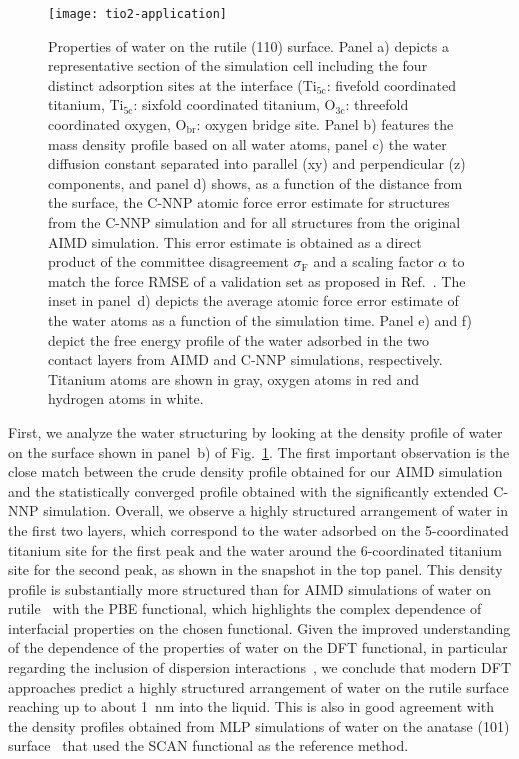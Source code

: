 \documentclass[aip,jcp,amsmath,amssymb,floatfix,reprint,citeautoscript,noeprint]{revtex4-1}
\begin{document}
\begin{bibunit}
\begin{figure}
\centering
\texttt{[image: tio2-application]}
\caption{\label{fig:tio2}
%
Properties of water on the rutile (110) surface.
%
%
Panel a) depicts a representative section of the simulation
cell including the four distinct adsorption sites at the
interface (Ti$_\text{5c}$: fivefold coordinated titanium,
Ti$_\text{5c}$: sixfold coordinated titanium,
O$_\text{3c}$: threefold coordinated oxygen,
O$_\text{br}$: oxygen bridge site.
%
Panel b) features the mass density profile based on all water atoms,
panel c) the water diffusion constant separated into parallel (xy) and perpendicular (z) components,
and panel d) shows, as a function
of the distance from the surface, the C-NNP atomic force error estimate for structures from the C-NNP simulation and for all structures from the original AIMD simulation.
%
This error estimate is obtained as a direct product of the committee disagreement $\sigma_\text{F}$ and a scaling factor $\alpha$ to match the force RMSE of a validation set as proposed in Ref.~.
%
The inset in panel~d) depicts the average atomic force error estimate of the water atoms as a function of the simulation time.
%
Panel e) and f) depict the free energy profile of the water adsorbed in the two contact layers from AIMD and C-NNP simulations, respectively.
%
Titanium atoms are shown in gray, oxygen atoms in red and hydrogen atoms in white.
}
\end{figure}

%
First, we analyze the water structuring by
looking at the density profile of water on the  surface
shown in panel~b) of Fig.~\ref{fig:tio2}.
%
The first important observation is the close
match between the crude density profile obtained
for our AIMD simulation and the statistically
converged profile obtained with the significantly
extended C-NNP simulation.
%
Overall, we observe a highly structured arrangement
of water in the first two layers, which
correspond to the water adsorbed on the 5-coordinated
titanium site for the first peak and the water
around the 6-coordinated titanium site for the second peak,
as shown in the snapshot in the top panel.
%
This density profile is substantially more structured
than for AIMD simulations of water
on rutile~\cite{Liu2010/10.1103/PhysRevB.82.161415}
with the PBE functional,
which highlights the complex dependence of
interfacial properties on the chosen functional.
%
Given the improved understanding of the dependence
of the properties of water on the DFT functional,
in particular regarding the inclusion of dispersion interactions~\cite{Gillan2016/10.1063/1.4944633},
we conclude that modern DFT approaches predict
a highly structured arrangement of water on
the rutile surface reaching up to about 1~nm
into the liquid.
%
This is also in good agreement with the density profiles
obtained from MLP simulations of water
on the anatase (101) surface~\cite{Andrade2020/10.1039/c9sc05116c}
that used the SCAN functional as the reference method.


\end{bibunit}
\end{document}
